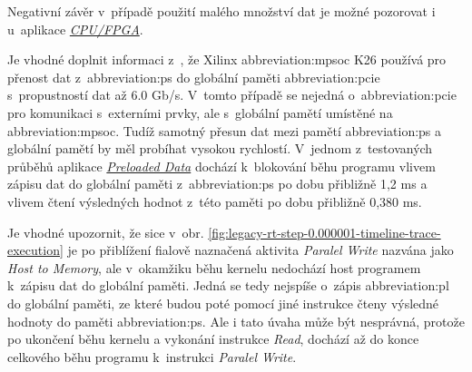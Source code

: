 \documentclass[a4paper, twoside, 11pt]{article}
\begin{document}
		Negativní závěr v~případě použití malého množství dat je možné pozorovat i u~aplikace \hyperref[subsec:poznatky-ziskane-profilovanim-aplikaci-cpu-fpga]{\textit{CPU/FPGA}}.\par
		Je vhodné doplnit informaci z~\cite{kria-k26-som-ds}, že Xilinx \gls{abbreviation:mpsoc} K26 používá pro přenost dat z~\gls{abbreviation:ps} do globální paměti \gls{abbreviation:pcie} s~propustností dat až 6.0 Gb/s. V~tomto případě se nejedná o~\gls{abbreviation:pcie} pro komunikaci s~externími prvky, ale s~globální pamětí umístěné na \gls{abbreviation:mpsoc}. Tudíž samotný přesun dat mezi pamětí \gls{abbreviation:ps} a globální pamětí by měl probíhat vysokou rychlostí. V~jednom z~testovaných průběhů aplikace \hyperref[subsec:preloaded-data]{\textit{Preloaded Data}} dochází k~blokování běhu programu vlivem zápisu dat do globální paměti z~\gls{abbreviation:ps} po dobu přibližně 1,2 ms a vlivem čtení výsledných hodnot z~této paměti po dobu přibližně 0,380 ms.\par
		Je vhodné upozornit, že sice v~obr. \ref{fig:legacy-rt-step-0.000001-timeline-trace-execution} je po přiblížení fialově naznačená aktivita \textit{Paralel Write} nazvána jako \textit{Host to Memory}, ale v~okamžiku běhu kernelu nedochází host programem k~zápisu dat do globální paměti. Jedná se tedy nejspíše o~zápis \gls{abbreviation:pl} do globální paměti, ze které budou poté pomocí jiné instrukce čteny výsledné hodnoty do paměti \gls{abbreviation:ps}. Ale i tato úvaha může být nesprávná, protože po ukončení běhu kernelu a vykonání instrukce \textit{Read}, dochází až do konce celkového běhu programu k~instrukci \textit{Paralel Write}.\par
		
	
\end{document}
